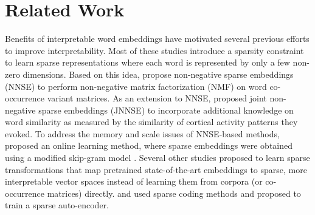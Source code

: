 \documentclass[11pt,a4paper]{article}
\begin{document}
\section{Related Work} \label{sec:related}

Benefits of interpretable word embeddings have motivated several previous efforts  to improve interpretability. Most of these studies introduce a sparsity constraint  to learn sparse representations where each word is represented by only a few non-zero dimensions. 
Based on this idea, \citet{murphy12nnse} propose non-negative sparse embeddings (NNSE)  to perform non-negative matrix factorization (NMF) on word co-occurrence variant matrices. As an extension to NNSE, \citet{fyshe14interpretable} proposed joint non-negative sparse embeddings (JNNSE) to incorporate additional knowledge on word similarity as measured by the similarity of cortical activity patterns they evoked. To address the memory and scale issues of NNSE-based methods, \citet{luo15online} proposed an online learning method, where sparse embeddings were obtained using a modified skip-gram model \citep{mikolov13word2vec_a}. Several other studies proposed to learn sparse transformations that map pretrained state-of-the-art embeddings to sparse, more interpretable vector spaces instead of learning them from corpora (or co-occurrence matrices) directly. \citet{arora18linalg} and \citet{faruqui15sparse} used sparse coding methods and \citep{subramanian18spine} proposed to train a sparse auto-encoder.

\end{document}
